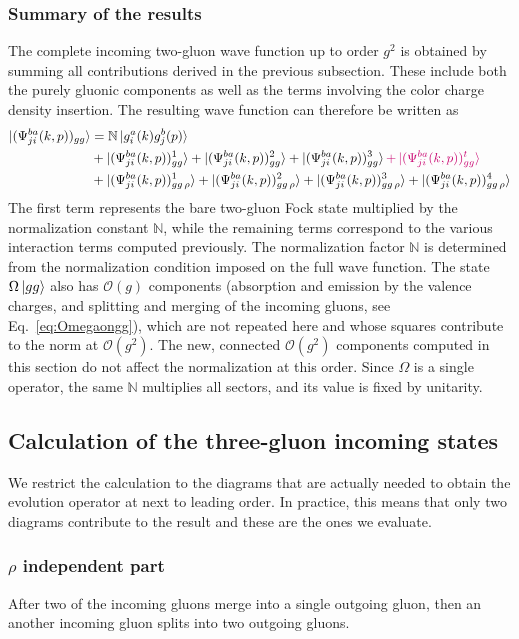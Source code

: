 \documentclass[a4paper,11pt]{article}
\def\mf#1{\mathbb{#1}}
\begin{document}
\subsubsection{Summary of the results}
The complete incoming two-gluon wave function up to order $g^{2}$ is obtained by summing all contributions derived in the previous subsection. These include both the purely gluonic components as well as the terms involving the color charge density insertion. The resulting wave function can therefore be written as
\begin{align}
    \ket{(\Psi^{ba}_{ji}(k,p))_{gg}} & = \mf{N} \ket{g^{a}_{i}(k)g^{b}_{j}(p)} \notag \\ & + \ket{(\Psi^{ba}_{ji}(k,p))^{1}_{gg}} + \ket{(\Psi^{ba}_{ji}(k,p))^{2}_{gg}} + \ket{(\Psi^{ba}_{ji}(k,p))^{3}_{gg}} {\color{chg}+ \ket{(\Psi^{ba}_{ji}(k,p))^{t}_{gg}}}\notag \\ & + \ket{(\Psi^{ba}_{ji}(k,p))^{1}_{gg\,\rho}}+ \ket{(\Psi^{ba}_{ji}(k,p))^{2}_{gg\,\rho}} + \ket{(\Psi^{ba}_{ji}(k,p))^{3}_{gg\,\rho}}+ \ket{(\Psi^{ba}_{ji}(k,p))^{4}_{gg\,\rho}}
\end{align}
The first term represents the bare two-gluon Fock state multiplied by the normalization constant $\mf{N}$, while the remaining terms correspond to the various interaction terms computed previously. The normalization factor $\mf{N}$ is determined from the normalization condition imposed on the full wave function. {\color{chg}The state $\Omega\ket{gg}$ also has $\mathcal{O}(g)$ components (absorption and emission by the valence charges, and splitting and merging of the incoming gluons, see Eq.~\eqref{eq:Omegaongg}), which are not repeated here and whose squares contribute to the norm at $\mathcal{O}(g^{2})$. The new, connected $\mathcal{O}(g^{2})$ components computed in this section do not affect the normalization at this order. Since $\Omega$ is a single operator, the same $\mf{N}$ multiplies all sectors, and its value is fixed by unitarity.}

\subsection{Calculation of the three-gluon incoming states} \label{sec:Threeglue}
We restrict the calculation to the diagrams that are actually needed to obtain the evolution operator at next to leading order. In practice, this means that only two diagrams contribute to the result and these are the ones we evaluate.

\subsubsection*{$\rho$ independent part}
After two of the incoming gluons merge into a single outgoing gluon, then an another incoming gluon splits into two outgoing gluons.
\end{document}
